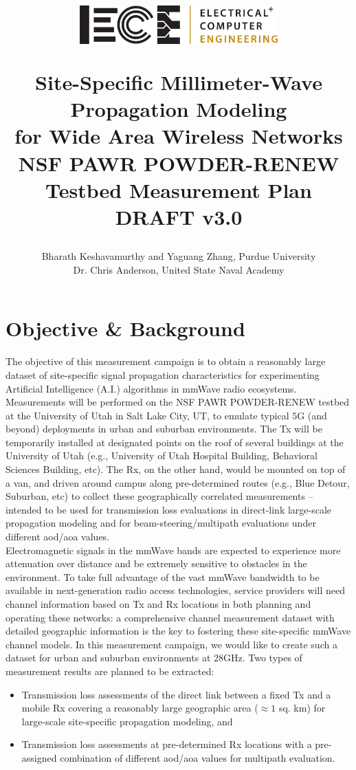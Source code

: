 \documentclass[12pt]{article}
\title{
    \vspace{-30mm}
    \begin{figure}[h]
        \centering
        \includegraphics[width=3in]{ece-horizontal-black-and-gold-rgb}
    \end{figure}
    \vspaceintitle
    \large Site-Specific Millimeter-Wave Propagation Modeling \\
        for Wide Area Wireless Networks \\
    \vspaceintitle
    \huge NSF PAWR POWDER-RENEW Testbed Measurement Plan\\
    \vspaceintitle
    \Large DRAFT v3.0}
\author{Bharath Keshavamurthy and Yaguang Zhang, Purdue University\\
Dr. Chris Anderson, United State Naval Academy}
\begin{document}
\maketitle
\tableofcontents
\newpage

\section{Objective \& Background}
    The objective of this measurement campaign is to obtain a reasonably large dataset of site-specific signal propagation characteristics for experimenting Artificial Intelligence (A.I.) algorithms in mmWave radio ecosystems. Measurements will be performed on the NSF PAWR POWDER-RENEW testbed at the University of Utah in Salt Lake City, UT, to emulate typical $5$G (and beyond) deployments in urban and suburban environments. The Tx will be temporarily installed at designated points on the roof of several buildings at the University of Utah (e.g., University of Utah Hospital Building, Behavioral Sciences Building, etc). The Rx, on the other hand, would be mounted on top of a van, and driven around campus along pre-determined routes (e.g., Blue Detour, Suburban, etc) to collect these geographically correlated measurements -- intended to be used for transmission loss evaluations in direct-link large-scale propagation modeling and for beam-steering/multipath evaluations under different \gls{aod}/\gls{aoa} values. \\

    \noindent Electromagnetic signals in the mmWave bands are expected to experience more attenuation over distance and be extremely sensitive to obstacles in the environment. To take full advantage of the vast mmWave bandwidth to be available in next-generation radio access technologies, service providers will need channel information based on Tx and Rx locations in both planning and operating these networks: a comprehensive channel measurement dataset with detailed geographic information is the key to fostering these site-specific mmWave channel models. In this measurement campaign, we would like to create such a dataset for urban and suburban environments at $28$GHz. Two types of measurement results are planned to be extracted: 
    \begin{itemize}
        \item Transmission loss assessments of the direct link between a fixed Tx and a mobile Rx covering a reasonably large geographic area (${\approx}1$ sq. km) for large-scale site-specific propagation modeling, and
        \item Transmission loss assessments at pre-determined Rx locations with a pre-assigned combination of different \gls{aod}/\gls{aoa} values for multipath evaluation.
    \end{itemize}
\end{document}
